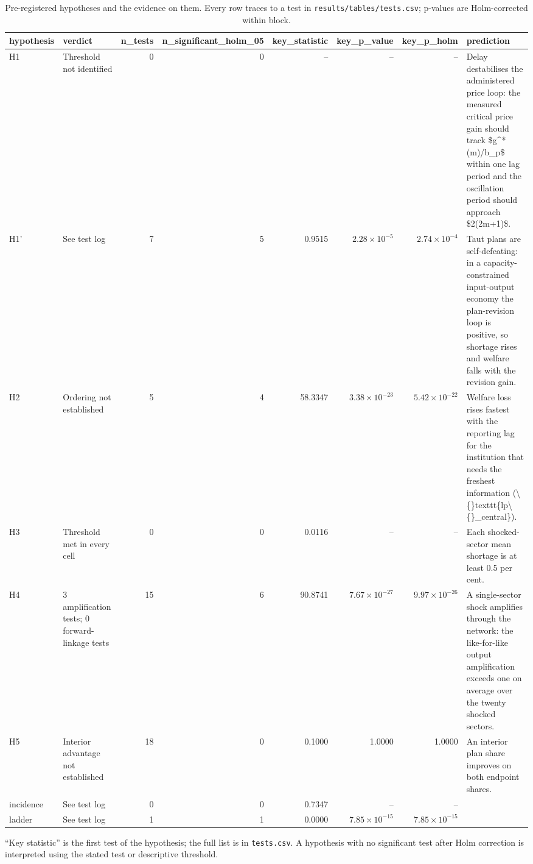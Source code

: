 \begin{table}[htbp]
\centering
\caption{Pre-registered hypotheses and the evidence on them. Every row traces to a test in \texttt{results/tables/tests.csv}; p-values are Holm-corrected within block.}
\label{tab:hypotheses}
\begin{tabular}{llrrrrrl}
\toprule
hypothesis & verdict & n\_tests & n\_significant\_holm\_05 & key\_statistic & key\_p\_value & key\_p\_holm & prediction \\
\midrule
H1 & Threshold not identified & 0 & 0 & -- & -- & -- & Delay destabilises the administered price loop: the measured critical price gain should track \$g^*(m)/b\_p\$ within one lag period and the oscillation period should approach \$2(2m+1)\$. \\
H1' & See test log & 7 & 5 & 0.9515 & $2.28\times10^{-5}$ & $2.74\times10^{-4}$ & Taut plans are self-defeating: in a capacity-constrained input-output economy the plan-revision loop is positive, so shortage rises and welfare falls with the revision gain. \\
H2 & Ordering not established & 5 & 4 & 58.3347 & $3.38\times10^{-23}$ & $5.42\times10^{-22}$ & Welfare loss rises fastest with the reporting lag for the institution that needs the freshest information (\textbackslash\{\}texttt\{lp\textbackslash\{\}\_central\}). \\
H3 & Threshold met in every cell & 0 & 0 & 0.0116 & -- & -- & Each shocked-sector mean shortage is at least 0.5 per cent. \\
H4 & 3 amplification tests; 0 forward-linkage tests & 15 & 6 & 90.8741 & $7.67\times10^{-27}$ & $9.97\times10^{-26}$ & A single-sector shock amplifies through the network: the like-for-like output amplification exceeds one on average over the twenty shocked sectors. \\
H5 & Interior advantage not established & 18 & 0 & 0.1000 & 1.0000 & 1.0000 & An interior plan share improves on both endpoint shares. \\
incidence & See test log & 0 & 0 & 0.7347 & -- & -- &  \\
ladder & See test log & 1 & 1 & 0.0000 & $7.85\times10^{-15}$ & $7.85\times10^{-15}$ &  \\
\bottomrule
\end{tabular}
\par\smallskip
\begin{minipage}{\linewidth}\footnotesize ``Key statistic'' is the first test of the hypothesis; the full list is in \texttt{tests.csv}. A hypothesis with no significant test after Holm correction is interpreted using the stated test or descriptive threshold.\end{minipage}
\end{table}
